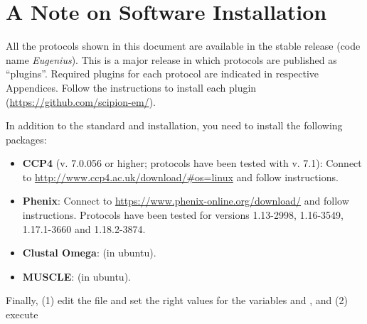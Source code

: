 \section{A Note on Software Installation}
  All the protocols shown in this document are available in the stable \scipion release  (code name \textit{Eugenius}). This is a major release in which protocols are published as ``plugins''. Required plugins for each protocol are indicated in respective Appendices. Follow the instructions to install each plugin (\url{https://github.com/scipion-em/}).


  In addition to the standard \scipion and  installation, you need to install the following packages:
  
  \begin{itemize}
   \item\textbf{CCP4} (v. 7.0.056 or higher; protocols have been tested with v. 7.1): Connect to \url{http://www.ccp4.ac.uk/download/#os=linux} and follow instructions.
   \item\textbf{Phenix}: Connect to \url{https://www.phenix-online.org/download/} and follow instructions. Protocols have been tested for versions
   1.13-2998, 1.16-3549, 1.17.1-3660 and 1.18.2-3874.
   \item\textbf{Clustal Omega}:  (in ubuntu).
   \item\textbf{MUSCLE}:  (in ubuntu).
  \end{itemize}

  
  Finally, (1) edit the file  and set the right values for the variables  and , and (2) execute 
